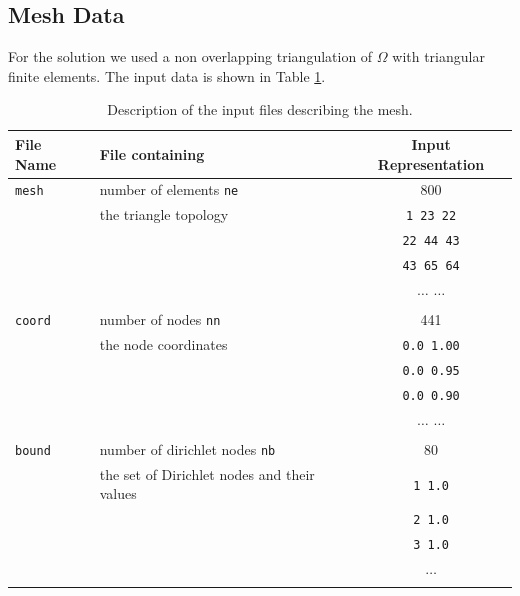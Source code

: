 \documentclass{article}
\begin{document}
\subsection{Mesh Data}
For the solution we used a non overlapping triangulation of $\Omega$ with triangular finite elements. The input data is shown in Table \ref{tab:meshinput}.
\begin{table}[htbp]
    \centering
    \begin{tabular}{l|l|c}
        \toprule
        \rowcolor{gray!20}
        \textbf{File Name} & \textbf{File containing} & \textbf{Input Representation} \\
        \midrule
        \texttt{mesh} & number of elements \texttt{ne} & 800\\
         &the triangle topology & \text{ }\texttt{1       23      22} \\
         & & \texttt{22      44      43} \\
         & & \texttt{43      65      64} \\
         & &  $\ldots$ $\ldots$ \\
         & & \\
        \texttt{coord} & number of nodes \texttt{nn} & 441\\
         & the node coordinates & \texttt{0.0 1.00} \\
         & & \texttt{0.0 0.95} \\
         & & \texttt{0.0 0.90} \\
         & & $\ldots$  $\ldots$ \\
         & & \\
        \texttt{bound} & number of dirichlet nodes \texttt{nb} & 80\\
         & the set of Dirichlet nodes and their values & \texttt{1 1.0} \\
         & & \texttt{2 1.0} \\
         & & \texttt{3 1.0} \\
         & & $\ldots$ \\
         & & \\
        \bottomrule
    \end{tabular}
    \caption{Description of the input files describing the mesh.}
    \label{tab:meshinput}
\end{table}
\end{document}
